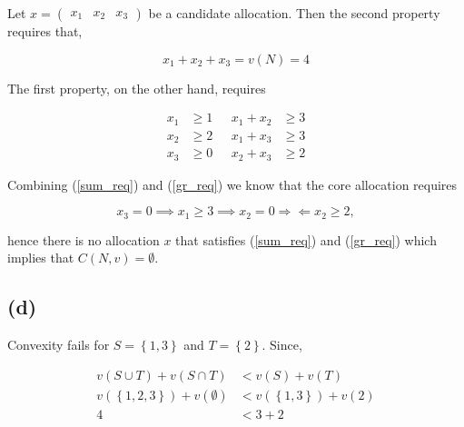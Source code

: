 \documentclass[american]{scrartcl}
\newcommand{\set}[1]{\left\{#1\right\}}
\begin{document}
Let $x = \begin{pmatrix}
        x_1 & x_2 & x_3
    \end{pmatrix}$ be a candidate allocation. Then the second property requires that,

\begin{equation} \label{sum_req}
    x_1 + x_2 + x_3 = v(N) = 4
\end{equation}

The first property, on the other hand, requires

\begin{equation} \label{gr_req}
    \begin{split}
        x_1 &\geq 1 \\
        x_2 &\geq 2 \\
        x_3 &\geq 0
    \end{split}
    \ \ \
    \begin{split}
        x_1 + x_2 &\geq 3\\
        x_1 + x_3 &\geq 3\\
        x_2 + x_3 &\geq 2
    \end{split}
\end{equation}

Combining (\ref{sum_req}) and (\ref{gr_req}) we know that the core allocation requires

\begin{equation}
    x_3 = 0 \implies x_1 \geq 3 \implies x_2 = 0 \Rightarrow\Leftarrow x_2 \geq 2,
\end{equation}

hence there is no allocation $x$ that satisfies (\ref{sum_req}) and (\ref{gr_req}) which implies that $C(N, v) = \emptyset$.

\subsection*{(d)}

Convexity fails for $S = \set{1, 3}$ and $T = \set{2}$. Since,

\begin{equation}
    \begin{split}
        v\left(S \cup T\right) + v\left(S \cap T\right) &< v(S) + v(T)\\
        v(\set{1, 2, 3}) + v(\emptyset) &< v(\set{1, 3}) + v(2) \\
        4 &< 3 + 2
    \end{split}
\end{equation}
\end{document}
